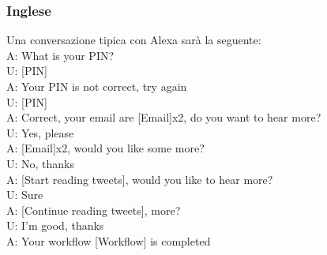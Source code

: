 \subsubsection{Inglese}
Una conversazione tipica con Alexa sarà la seguente:\\
A: What is your PIN? \\
U: [PIN] \\
A: Your PIN is not correct, try again \\
U: [PIN] \\
A: Correct, your email are [Email]x2, do you want to hear more?\\
U: Yes, please \\
A: [Email]x2, would you like some more? \\
U: No, thanks \\
A: [Start reading tweets], would you like to hear more?\\
U: Sure \\
A: [Continue reading tweets], more?\\
U: I'm good, thanks \\
A: Your workflow [Workflow] is completed

